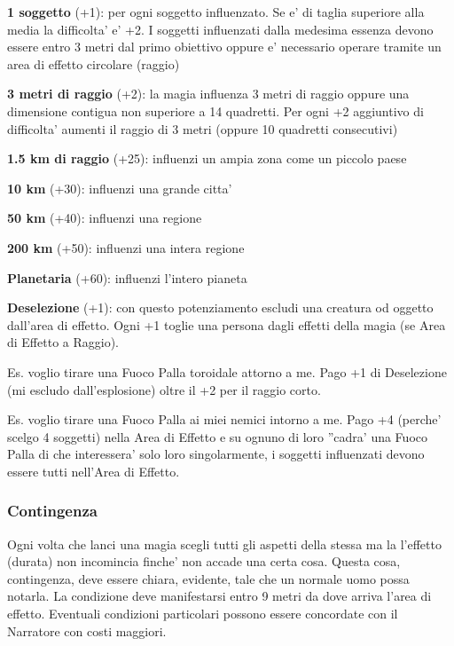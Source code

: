 \documentclass[a4paper,11pt,twoside,openany]{book}
\begin{document}
	\textbf{1 soggetto} (+1): per ogni soggetto influenzato. Se e' di taglia superiore alla media la difficolta' e' +2. I soggetti influenzati dalla medesima essenza devono essere entro 3 metri dal primo obiettivo oppure e' necessario operare tramite un area di effetto circolare (raggio)
	
	\textbf{3 metri di raggio} (+2): la magia influenza 3 metri di raggio oppure una dimensione contigua non superiore a 14 quadretti. Per ogni +2 aggiuntivo di difficolta' aumenti il raggio di 3 metri (oppure 10 quadretti consecutivi)
	
	\textbf{1.5 km di raggio} (+25): influenzi un ampia zona come un piccolo paese
	
	\textbf{10 km} (+30): influenzi una grande citta'
	
	\textbf{50 km} (+40): influenzi una regione
	
	\textbf{200 km} (+50): influenzi una intera regione
	
	\textbf{Planetaria} (+60): influenzi l'intero pianeta
	
	\textbf{Deselezione} (+1): con questo potenziamento escludi una creatura od oggetto dall'area di effetto. Ogni +1 toglie una persona dagli effetti della magia (se Area di Effetto a Raggio).
	
	Es. voglio tirare una Fuoco Palla toroidale attorno a me. Pago +1 di Deselezione (mi escludo dall'esplosione) oltre il +2 per il raggio corto.
	
	Es. voglio tirare una Fuoco Palla ai miei nemici intorno a me. Pago +4 (perche' scelgo 4 soggetti) nella Area di Effetto e su ognuno di loro ''cadra' una Fuoco Palla di che interessera' solo loro singolarmente, i soggetti influenzati devono essere tutti nell'Area di Effetto.
	
	\subsubsection{Contingenza}
	
	\label{contingenza}
	
	Ogni volta che lanci una magia scegli tutti gli aspetti della stessa ma la l'effetto (durata) non incomincia finche' non accade una certa cosa. Questa cosa, contingenza, deve essere chiara, evidente, tale che un normale uomo possa notarla. La condizione deve manifestarsi entro 9 metri da dove arriva l'area di effetto. Eventuali condizioni particolari possono essere concordate con il Narratore con costi maggiori. 
	
\end{document}

